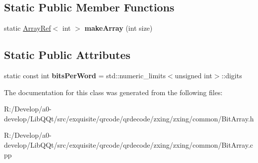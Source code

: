 \subsection*{Static Public Member Functions}
\begin{DoxyCompactItemize}
\item 
\mbox{\label{classzxing_1_1_bit_array_ab0254c292e397b0aa3951f0b108bc485}} 
static \mbox{\hyperlink{classzxing_1_1_array_ref}{Array\+Ref}}$<$ int $>$ {\bfseries make\+Array} (int size)
\end{DoxyCompactItemize}
\subsection*{Static Public Attributes}
\begin{DoxyCompactItemize}
\item 
\mbox{\label{classzxing_1_1_bit_array_aa88d505cca57cde9a6db45c90d377ab9}} 
static const int {\bfseries bits\+Per\+Word} = std\+::numeric\+\_\+limits$<$unsigned int$>$\+::digits
\end{DoxyCompactItemize}


The documentation for this class was generated from the following files\+:\begin{DoxyCompactItemize}
\item 
R\+:/\+Develop/a0-\/develop/\+Lib\+Q\+Qt/src/exquisite/qrcode/qrdecode/zxing/zxing/common/Bit\+Array.\+h\item 
R\+:/\+Develop/a0-\/develop/\+Lib\+Q\+Qt/src/exquisite/qrcode/qrdecode/zxing/zxing/common/Bit\+Array.\+cpp\end{DoxyCompactItemize}
